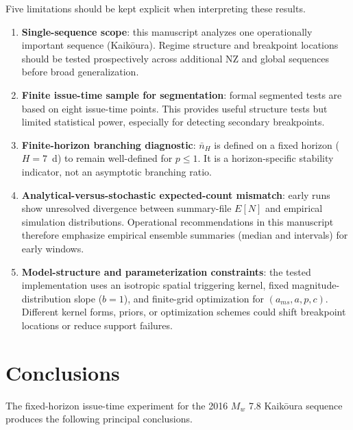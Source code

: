 \documentclass[12pt,letterpaper]{article}
\begin{document}
Five limitations should be kept explicit when interpreting these results.
\begin{enumerate}
    \item \textbf{Single-sequence scope}: this manuscript analyzes one
    operationally important sequence (Kaik\={o}ura). Regime structure and
    breakpoint locations should be tested prospectively across additional NZ and
    global sequences before broad generalization.

    \item \textbf{Finite issue-time sample for segmentation}: formal segmented
    tests are based on eight issue-time points. This provides useful structure
    tests but limited statistical power, especially for detecting secondary
    breakpoints.

    \item \textbf{Finite-horizon branching diagnostic}: $\bar n_H$ is defined on
    a fixed horizon ($H=7$~d) to remain well-defined for $p\le1$. It is a
    horizon-specific stability indicator, not an asymptotic branching ratio.

    \item \textbf{Analytical-versus-stochastic expected-count mismatch}: early
    runs show unresolved divergence between summary-file $E[N]$ and empirical
    simulation distributions. Operational recommendations in this manuscript
    therefore emphasize empirical ensemble summaries (median and intervals) for
    early windows.

    \item \textbf{Model-structure and parameterization constraints}: the tested
    implementation uses an isotropic spatial triggering kernel, fixed
    magnitude-distribution slope ($b=1$), and finite-grid optimization for
    $(a_{ms},a,p,c)$. Different kernel forms, priors, or optimization schemes
    could shift breakpoint locations or reduce support failures.
\end{enumerate}

\section{Conclusions}

The fixed-horizon issue-time experiment for the 2016 $M_w$ 7.8 Kaik\={o}ura
sequence produces the following principal conclusions.
\end{document}
